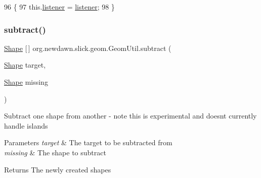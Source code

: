 \begin{DoxyCode}
96                                                        \{
97         this.\mbox{\hyperlink{classorg_1_1newdawn_1_1slick_1_1geom_1_1_geom_util_a322b4fbea4e3b04b040c81c1322809bb}{listener}} = \mbox{\hyperlink{classorg_1_1newdawn_1_1slick_1_1geom_1_1_geom_util_a322b4fbea4e3b04b040c81c1322809bb}{listener}};
98     \}
\end{DoxyCode}
\mbox{\label{classorg_1_1newdawn_1_1slick_1_1geom_1_1_geom_util_a4c08d4344876c0f7225933783a26a56a}} 
\subsubsection{\texorpdfstring{subtract()}{subtract()}}
{\footnotesize\ttfamily \mbox{\hyperlink{classorg_1_1newdawn_1_1slick_1_1geom_1_1_shape}{Shape}} \mbox{[}$\,$\mbox{]} org.\+newdawn.\+slick.\+geom.\+Geom\+Util.\+subtract (\begin{DoxyParamCaption}\item[{\mbox{\hyperlink{classorg_1_1newdawn_1_1slick_1_1geom_1_1_shape}{Shape}}}]{target,  }\item[{\mbox{\hyperlink{classorg_1_1newdawn_1_1slick_1_1geom_1_1_shape}{Shape}}}]{missing }\end{DoxyParamCaption})\hspace{0.3cm}{\ttfamily [inline]}}

Subtract one shape from another -\/ note this is experimental and doesn\textquotesingle{}t currently handle islands


\begin{DoxyParams}{Parameters}
{\em target} & The target to be subtracted from \\
\hline
{\em missing} & The shape to subtract \\
\hline
\end{DoxyParams}
\begin{DoxyReturn}{Returns}
The newly created shapes 
\end{DoxyReturn}

